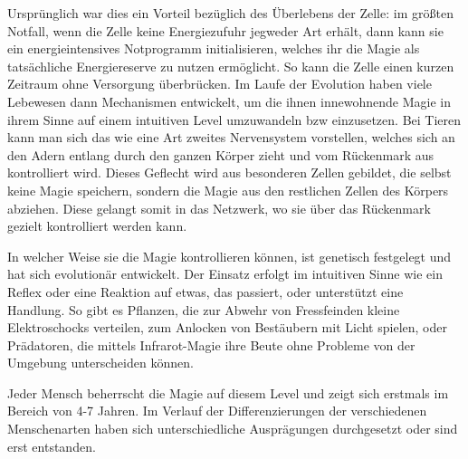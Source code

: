 Ursprünglich war dies ein Vorteil bezüglich des Überlebens der Zelle: im größten Notfall, wenn die Zelle keine Energiezufuhr jegweder Art erhält, dann kann sie ein energieintensives Notprogramm initialisieren, welches ihr die Magie als tatsächliche Energiereserve zu nutzen ermöglicht.
So kann die Zelle einen kurzen Zeitraum ohne Versorgung überbrücken.
Im Laufe der Evolution haben viele Lebewesen dann Mechanismen entwickelt, um die ihnen innewohnende Magie in ihrem Sinne auf einem intuitiven Level umzuwandeln bzw einzusetzen.
Bei Tieren kann man sich das wie eine Art zweites Nervensystem vorstellen, welches sich an den Adern entlang durch den ganzen Körper zieht und vom Rückenmark aus kontrolliert wird.
Dieses Geflecht wird aus besonderen Zellen gebildet, die selbst keine Magie speichern, sondern die Magie aus den restlichen Zellen des Körpers abziehen.
Diese gelangt somit in das Netzwerk, wo sie über das Rückenmark gezielt kontrolliert werden kann.

In welcher Weise sie die Magie kontrollieren können, ist genetisch festgelegt und hat sich evolutionär entwickelt.
Der Einsatz erfolgt im intuitiven Sinne wie ein Reflex oder eine Reaktion auf etwas, das passiert, oder unterstützt eine Handlung. 
So gibt es Pflanzen, die zur Abwehr von Fressfeinden kleine Elektroschocks verteilen, zum Anlocken von Bestäubern mit Licht spielen, oder Prädatoren, die mittels Infrarot-Magie ihre Beute ohne Probleme von der Umgebung unterscheiden können.

Jeder Mensch beherrscht die Magie auf diesem Level und zeigt sich erstmals im Bereich von 4-7 Jahren.
Im Verlauf der Differenzierungen der verschiedenen Menschenarten haben sich unterschiedliche Ausprägungen durchgesetzt oder sind erst entstanden.


